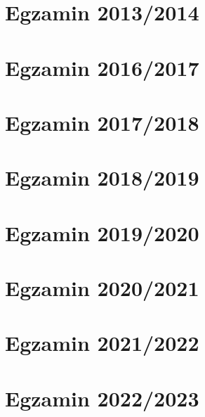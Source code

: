 \section{Egzamin 2013/2014}


\section{Egzamin 2016/2017}


\section{Egzamin 2017/2018}


\newpage
\section{Egzamin 2018/2019}


\newpage
\section{Egzamin 2019/2020}


\newpage 
\section{Egzamin 2020/2021}


\newpage
\section{Egzamin 2021/2022}


\newpage
\section{Egzamin 2022/2023}

